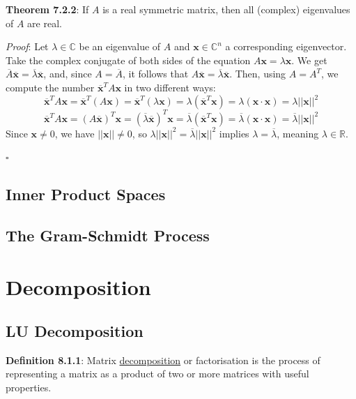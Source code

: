 \documentclass{article}
\newcommand{\separate}[1] {\vspace{#1 pt}\noindent}
\newcommand{\R}{\mathbb{R}}
\newcommand{\C}{\mathbb{C}}
\newcommand{\definition}[2]{\textbf{Definition #1}: #2\label{def:#1}}
\newcommand{\proof}[2]{\textit{Proof}: #2 \begin{flushright}\(\square\)\end{flushright}\label{prf:#1}}
\newcommand{\theorem}[3]{\textbf{Theorem #1}: #2 \par\separate{3}\proof{thm:#1}{#3}\label{thm:#1}}
\begin{document}
\separate{7}\theorem{7.2.2}{If \(A\) is a real symmetric matrix, then all (complex) eigenvalues of \(A\) are real.}
{Let \(\lambda \in \C\) be an eigenvalue of \(A\) and \(\mathbf{x} \in \C^n\) a corresponding eigenvector. Take the complex conjugate of both sides of the equation \(A\mathbf{x} = \lambda\mathbf{x}\). We get \(\overline{A}\overline{\mathbf{x}} = \overline{\lambda}\overline{\mathbf{x}}\), and, since \(A = \overline{A}\), it follows that \(A\overline{\mathbf{x}} = \overline{\lambda}\overline{\mathbf{x}}\). Then, using \(A=A^T\), we compute the number \(\overline{\mathbf{x}}^TA\mathbf{x}\) in two different ways:
\begin{equation}
    \overline{\mathbf{x}}^TA\mathbf{x} = \overline{\mathbf{x}}^T(A\mathbf{x}) = \overline{\mathbf{x}}^T(\lambda\mathbf{x}) = \lambda(\overline{\mathbf{x}}^T\mathbf{x}) = \lambda(\mathbf{x} \cdot \mathbf{x}) = \lambda||\mathbf{x}||^2
\end{equation}
\begin{equation}
     \overline{\mathbf{x}}^TA\mathbf{x} = (A\overline{\mathbf{x}})^T\mathbf{x} = (\overline{\lambda}\overline{\mathbf{x}})^T\mathbf{x} = \overline{\lambda}(\overline{\mathbf{x}}^T\mathbf{x}) = \overline{\lambda}(\mathbf{x} \cdot \mathbf{x}) = \overline{\lambda}||\mathbf{x}||^2
\end{equation}
Since \(\mathbf{x} \neq 0\), we have \(||\mathbf{x}|| \neq 0\), so \(\lambda||\mathbf{x}||^2 = \overline{\lambda}||\mathbf{x}||^2\) implies \(\lambda = \overline{\lambda}\), meaning \(\lambda \in \R\).
}

\subsection{Inner Product Spaces}

\subsection{The Gram-Schmidt Process}

\section{Decomposition}

\subsection{LU Decomposition}

\definition{8.1.1}{Matrix \underline{decomposition} or factorisation is the process of representing a matrix as a product of two or more matrices with useful properties.}
\end{document}
